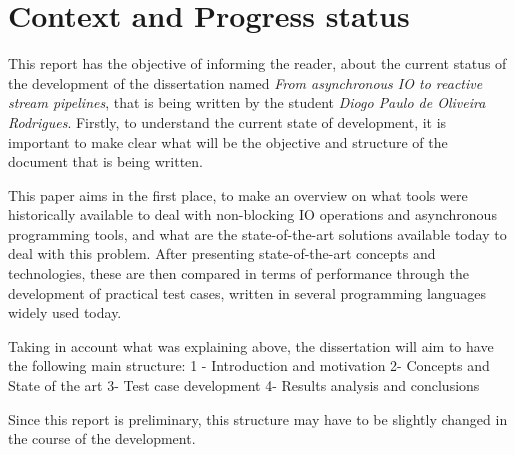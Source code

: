 % 
%  
%
\chapter{Context and Progress status}
\label{cha:introduction}


This report has the objective of informing the reader, about the current status of the development of the dissertation named \textit{From asynchronous IO to reactive stream pipelines}, that is being written by the student \textit{Diogo Paulo de Oliveira Rodrigues}.
Firstly, to understand the current state of development, it is important to make clear what will be the objective and structure of the document that is being written.

This paper aims in the first place, to make an overview on what tools were historically available to deal with non-blocking IO operations and asynchronous programming tools, and what are the state-of-the-art solutions available today to deal with this problem.
After presenting state-of-the-art concepts and technologies, these are then compared in terms of performance through the development of practical test cases, written in several programming languages widely used today.

Taking in account what was explaining above, the dissertation will aim to have the following main structure: 
	1 - Introduction and motivation
	2-  Concepts and State of the art
	3- 	Test case development
	4- 	Results analysis and conclusions

Since this report is preliminary, this structure may have to be slightly changed in the course of the development.

